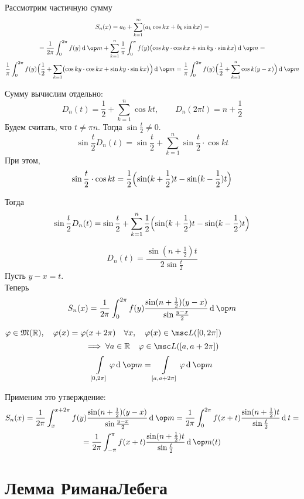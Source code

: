 Рассмотрим частичную сумму
\begin{multline*}
	S_n(x) = a_0 + \sum_{k = 1}^\infty (a_k \cos kx + b_k \sin kx) = \\
	= \frac1{2\pi} \int_0^{2\pi} f(y) \di \op m + \sum_{k = 1}^n \frac1\pi \int_0^\pi f(y) \bigl( \cos ky \cdot \cos kx + \sin ky \cdot \sin kx \bigr) \di \op m = \\
	\frac1\pi \int_0^{2\pi} f(y) \Bigl( \frac12 + \sum_{k = 1} \bigl( \cos ky \cdot \cos kx + \sin ky \cdot \sin kx \bigr) \Bigr) \di \op m =
	\frac1\pi \int_0^{2\pi} f(y) \Bigl( \frac12 + \sum_{k = 1}^n \cos k(y - x) \Bigr) \di \op m
\end{multline*}

Сумму вычислим отдельно:
$$ D_n(t) = \frac12 + \sum_{k = 1}^n \cos kt, \qquad D_n(2\pi l) = n + \frac12 $$
Будем считать, что $ t \ne \pi n $. Тогда $ \sin \frac t2 \ne 0 $.
$$ \sin \frac t2 D_n(t) = \sin \frac t2 + \sum_{k = 1}^n \sin \frac t2 \cdot \cos kt $$
При этом,
$$ \sin \frac t2 \cdot \cos kt = \frac12 \Bigl( \sin (k + \frac12) t - \sin (k - \frac12) t \Bigr) $$

Тогда
$$ \sin \frac t2 D_n(t) = \sin \frac t2 + \sum_{k = 1}^n \frac12 \Bigl( \sin (k + \frac12) t - \sin (k - \frac12) t \Bigr) $$

$$ D_n(t) = \frac{\sin(n + \frac12)t}{2 \sin \frac t2} $$
Пусть $ y - x = t $. \\
Теперь
$$ S_n(x) = \frac1{2\pi} \int_0^{2\pi} f(y) \frac{\sin (n + \frac12)(y - x)}{\sin \frac{y - x}2} \di \op m $$

\begin{statement}
	$ \phi \in \mathfrak M(\R), \quad \phi(x) = \phi(x + 2\pi) \quad \forall x, \quad \phi(x) \in \msc L([0, 2\pi]) $
	$$ \implies \forall a \in \R \quad \phi \in \msc L([a, a + 2\pi]) $$
	$$ \int\limits_{[0, 2\pi]} \phi \di \op m = \int\limits_{[a, a + 2\pi]} \phi \di \op m $$
\end{statement}

Применим это утверждение:
\begin{multline*}
	S_n(x) = \frac1{2\pi} \int_x^{x + 2\pi} f(y) \frac{\sin (n + \frac12)(y - x)}{\sin \frac{y - x}2} \di \op m = \frac1{2\pi} \int_0^{2\pi} f(x + t) \frac{\sin(n + \frac12)t}{\sin \frac t2} \di t = \\
	= \frac1{2\pi} \int_{-\pi}^\pi f(x + t) \frac{\sin(n + \frac12)t}{\sin \frac t2} \di \op m(t)
\end{multline*}

\section{Лемма РиманаЛебега}

